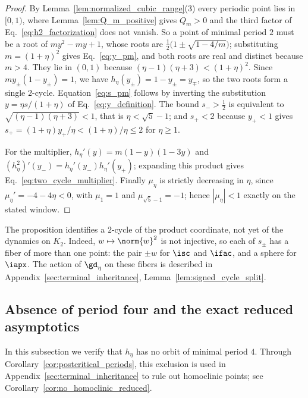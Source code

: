 \documentclass{article}
\begin{document}
\begin{proof}
By Lemma~\ref{lem:normalized_cubic_range}(3) every periodic point lies in
$[0,1)$, where Lemma~\ref{lem:Q_m_positive} gives $Q_m>0$ and the third factor
of Eq.~\eqref{eq:h2_factorization} does not vanish. So a point of minimal period
$2$ must be a root of $my^2-my+1$, whose roots are
$\frac12\bigl(1\pm\sqrt{1-4/m}\bigr)$; substituting $m=(1+\eta)^2$ gives
Eq.~\eqref{eq:y_pm}, and both roots are real and distinct because $m>4$. They
lie in $(0,1)$ because $(\eta-1)(\eta+3)<(1+\eta)^2$. Since
$my_\pm(1-y_\pm)=1$, we have $h_\eta(y_\pm)=1-y_\pm=y_\mp$, so the two roots
form a single $2$-cycle. Equation~\eqref{eq:s_pm} follows by inverting the substitution
$y=\eta s/(1+\eta)$ of Eq.~\eqref{eq:y_definition}.
The bound $s_->\tfrac12$ is equivalent to $\sqrt{(\eta-1)(\eta+3)}<1$, that is
$\eta<\sqrt5-1$; and $s_+<2$ because $y_+<1$ gives
$s_+=(1+\eta)y_+/\eta<(1+\eta)/\eta\le2$ for $\eta\ge1$.

For the multiplier, $h_\eta'(y)=m(1-y)(1-3y)$ and
$(h_\eta^2)'(y_-)=h_\eta'(y_-)h_\eta'(y_+)$; expanding this product gives
Eq.~\eqref{eq:two_cycle_multiplier}. Finally $\mu_\eta$ is strictly decreasing in
$\eta$, since $\mu_\eta'=-4-4\eta<0$, with $\mu_1=1$ and
$\mu_{\sqrt5-1}=-1$; hence $|\mu_\eta|<1$ exactly on the stated window.
\end{proof}

\begin{remark}
The proposition identifies a $2$-cycle of the product coordinate, not yet of
the dynamics on $K_2$. Indeed, $w\mapsto\norm{w}^2$ is not injective, so each
of $s_\pm$ has a fiber of more than one point: the pair $\pm w$ for $\isc$ and
$\ifac$, and a sphere for $\iapx$. The action of $\gd_\eta$ on these fibers is
described in Appendix~\ref{sec:terminal_inheritance},
Lemma~\ref{lem:signed_cycle_split}.
\end{remark}

\subsection{Absence of period four and the exact reduced asymptotics}
\label{subsec:no_period_four}

In this subsection we verify that $h_\eta$ has no orbit of minimal period $4$.
Through Corollary~\ref{cor:postcritical_periods}, this exclusion is used in
Appendix~\ref{sec:terminal_inheritance} to rule out homoclinic points; see
Corollary~\ref{cor:no_homoclinic_reduced}.
\end{document}
